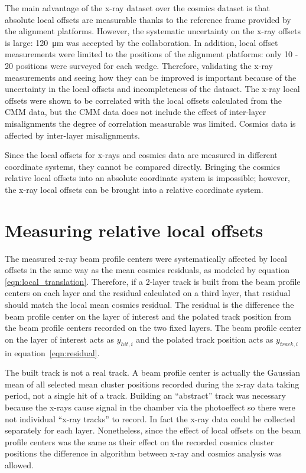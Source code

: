 The main advantage of the x-ray dataset over the cosmics dataset is that absolute local offsets are measurable thanks to the reference frame provided by the alignment platforms. However, the systematic uncertainty on the x-ray offsets is large: \SI{120}{\micro\meter} was accepted by the collaboration. In addition, local offset measurements were limited to the positions of the alignment platforms: only 10 - 20 positions were surveyed for each wedge. Therefore, validating the x-ray measurements and seeing how they can be improved is important because of the uncertainty in the local offsets and incompleteness of the dataset. The x-ray local offsets were shown to be correlated with the local offsets calculated from the CMM data, but the CMM data does not include the effect of inter-layer misalignments the degree of correlation measurable was limited. Cosmics data is affected by inter-layer misalignments.

Since the local offsets for x-rays and cosmics data are measured in different coordinate systems, they cannot be compared directly. Bringing the cosmics relative local offsets into an absolute coordinate system is impossible; however, the x-ray local offsets can be brought into a relative coordinate system.

\section{Measuring relative local offsets}
The measured x-ray beam profile centers were systematically affected by local offsets in the same way as the mean cosmics residuals, as modeled by equation \ref{eqn:local_translation}. Therefore, if a 2-layer track is built from the beam profile centers on each layer and the residual calculated on a third layer, that residual should match the local mean cosmics residual. The residual is the difference the beam profile center on the layer of interest and the polated track position from the beam profile centers recorded on the two fixed layers. The beam profile center on the layer of interest acts as $y_{hit, i}$ and the polated track position acts as $y_{track, i}$ in equation~\ref{eqn:residual}.

The built track is not a real track. A beam profile center is actually the Gaussian mean of all selected mean cluster positions recorded during the x-ray data taking period, not a single hit of a track. Building an ``abstract'' track was necessary because the x-rays cause signal in the chamber via the photoeffect so there were not individual ``x-ray tracks'' to record. In fact the x-ray data could be collected separately for each layer. Nonetheless, since the effect of local offsets on the beam profile centers was the same as their effect on the recorded cosmics cluster positions the difference in algorithm between x-ray and cosmics analysis was allowed. 

